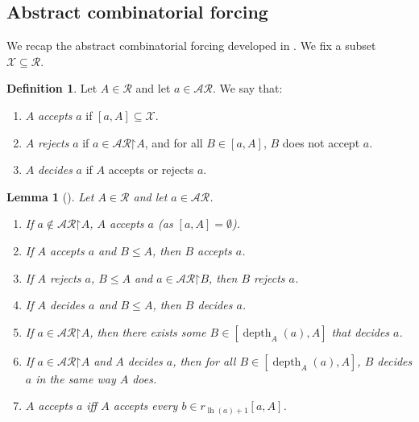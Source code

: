 \documentclass[11pt,reqno]{amsart}
\theoremstyle{plain}
\numberwithin{equation}{section}
\newtheorem{lemma}[theorem]{Lemma}
\theoremstyle{definition}
\newtheorem{definition}[theorem]{Definition}
\newcommand{\func}{\operatorname}
\newcommand{\cal}{\mathcal}
\newcommand{\restrictedto}{\mathord{\upharpoonright}}
\newcommand{\X}{\cal{X}}
\newcommand{\lh}{\func{lh}}
\newcommand{\depth}{\func{depth}}
\DeclareRobustCommand{\S}{\ifmmode\mathcal{S}\else\Sec\fi}
\begin{document}
\subsection{Abstract combinatorial forcing}
We recap the abstract combinatorial forcing developed in \cite[\S4.3]{T10}. We fix a subset $\X \subseteq \cal{R}$.

\begin{definition}
    Let $A \in \cal{R}$ and let $a \in \cal{AR}$. We say that:
    \begin{enumerate}
        \item $A$ \emph{accepts} $a$ if $[a,A] \subseteq \X$.

        \item $A$ \emph{rejects} $a$ if $a \in \cal{AR}\restrictedto A$, and for all $B \in [a,A]$, $B$ does not accept $a$.

        \item $A$ \emph{decides} $a$ if $A$ accepts or rejects $a$.
    \end{enumerate}
\end{definition}

\begin{lemma}[{\cite[Lemma 4.31]{T10}}]
\label{lem:combinatorial.forcing.basics}
    Let $A \in \cal{R}$ and let $a \in \cal{AR}$.
    \begin{enumerate}
        \item If $a \notin\cal{AR}\restrictedto A$, $A$ accepts $a$ (as $[a,A] = \emptyset$).

        \item If $A$ accepts $a$ and $B \leq A$, then $B$ accepts $a$.

        \item If $A$ rejects $a$, $B \leq A$ and $a \in \cal{AR}\restrictedto B$, then $B$ rejects $a$.

        \item If $A$ decides $a$ and $B \leq A$, then $B$ decides $a$.

        \item If $a \in \cal{AR}\restrictedto A$, then there exists some $B \in [\depth_A(a),A]$ that decides $a$.

        \item If $a \in \cal{AR}\restrictedto A$ and $A$ decides $a$, then for all $B \in [\depth_A(a),A]$, $B$ decides $a$ in the same way $A$ does.

        \item $A$ accepts $a$ iff $A$ accepts every $b \in r_{\lh(a)+1}[a,A]$.
    \end{enumerate}
\end{lemma}
\end{document}
